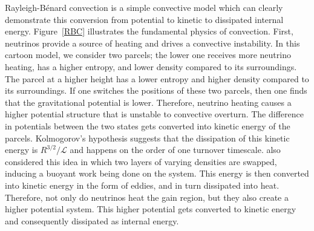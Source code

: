 \documentclass[twocolumn]{aastex6}
\begin{document}
\begin{figure*}[t]
\caption{Neutrinos heat the gain region and setup a higher potential
  state, which turbulence taps and dissipates as heat.
    Panel a): when a parcel of matter advects through the gain region,
    neutrinos heat it, which sets up a buoyantly unstable situation.  Panel b): Parcel 1 wants to buoyantly sink and parcel 2
  wants to buoyantly rise.  The final state has a lower potential
  energy than the final state.  Panel c): This change in potential
  energy is converted to turbulent kinetic energy which dissipates via
  turbulent dissipation.  Therefore, in 1D, part of the energy of
  neutrinos heats the gain region and part of the neutrino energy goes
  into setting up the higher potential profile.  Multi-dimensional
  turbulence taps into this higher potential energy by allowing for a
  lower potential state and turbulent kinetic energy.  Then that
  turbulent kinetic energy is dissipated through viscosity. }
\label{RBC}
\end{figure*}



Rayleigh-B\'enard convection is a simple convective model which can
clearly demonstrate this conversion from potential to kinetic to
dissipated internal energy. Figure~\ref{RBC} illustrates the
fundamental physics of convection. First, neutrinos provide a source
of heating and drives a convective instability. In this cartoon model,
we consider two parcels; the lower one receives more neutrino heating,
has a higher entropy, and lower density compared to its
surroundings. The parcel at a higher height has a lower entropy and higher density
compared to its surroundings. If one switches the positions of these
two parcels, then one finds that the gravitational potential is
lower. Therefore, neutrino heating causes a higher potential structure
that is unstable to convective overturn. The difference in potentials
between the two states gets converted into kinetic energy of the
parcels. Kolmogorov's hypothesis suggests that the dissipation of this
kinetic energy is $R^{3/2}/\mathcal{L}$ and happens on the order of
one turnover timescale.  \citet{burrows95} also considered this idea in
which two layers of varying densities are swapped, inducing a buoyant
work being done on the system. This energy is then converted into
kinetic energy in the form of eddies, and in turn dissipated into
heat. Therefore, not only do neutrinos heat the gain region, but they
also create a higher potential system. This higher potential gets
converted to kinetic energy and consequently dissipated as internal
energy.
\end{document}
